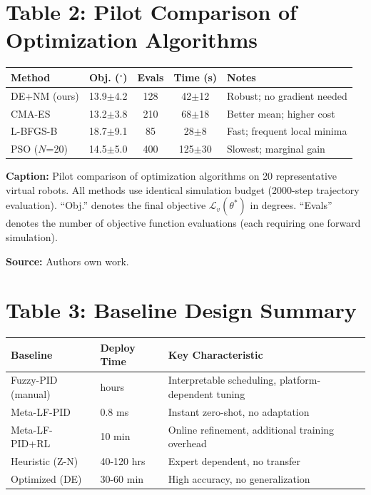 \documentclass[11pt,a4paper]{article}
\begin{document}
\section*{Table 2: Pilot Comparison of Optimization Algorithms}

\begin{tabular}{@{\extracolsep{\fill}}lcccl@{}}
\hline
\textbf{Method} & \textbf{Obj. ($^\circ$)} & \textbf{Evals} & \textbf{Time (s)} & \textbf{Notes} \\
\hline
DE+NM (ours) & 13.9$\pm$4.2 & 128 & 42$\pm$12 & Robust; no gradient needed \\
CMA-ES & 13.2$\pm$3.8 & 210 & 68$\pm$18 & Better mean; higher cost \\
L-BFGS-B & 18.7$\pm$9.1 & 85 & 28$\pm$8 & Fast; frequent local minima \\
PSO ($N$=20) & 14.5$\pm$5.0 & 400 & 125$\pm$30 & Slowest; marginal gain \\
\hline
\end{tabular}

\vspace{0.2cm}
\noindent
\textbf{Caption:} Pilot comparison of optimization algorithms on 20 representative virtual robots. All methods use identical simulation budget (2000-step trajectory evaluation). ``Obj.'' denotes the final objective $\mathcal{L}_v(\theta^*)$ in degrees. ``Evals'' denotes the number of objective function evaluations (each requiring one forward simulation).

\vspace{0.2cm}
\noindent
\textbf{Source:} Authors own work.


\section*{Table 3: Baseline Design Summary}

\begin{tabular}{@{\extracolsep{\fill}}lll}
\hline
\textbf{Baseline} & \textbf{Deploy Time} & \textbf{Key Characteristic} \\
\hline
Fuzzy-PID (manual) & hours & Interpretable scheduling, platform-dependent tuning \\
Meta-LF-PID & 0.8 ms & Instant zero-shot, no adaptation \\
Meta-LF-PID+RL & 10 min & Online refinement, additional training overhead \\
Heuristic (Z-N) & 40-120 hrs & Expert dependent, no transfer \\
Optimized (DE) & 30-60 min & High accuracy, no generalization \\
\hline
\end{tabular}
\end{document}

